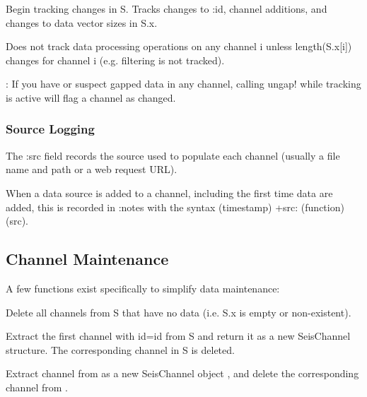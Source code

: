 \documentclass[letterpaper,11pt,english]{sphinxmanual}
\begin{document}
Begin tracking changes in S. Tracks changes to :id, channel additions, and
changes to data vector sizes in S.x.

Does not track data processing operations on any channel i unless
length(S.x{[}i{]}) changes for channel i (e.g. filtering is not tracked).

: If you have or suspect gapped data in any channel, calling
ungap! while tracking is active will flag a channel as changed.


\subsubsection{Source Logging}
\label{\detokenize{src/working_with_data:source-logging}}
The :src field records the  source used to populate each channel (usually
a file name and path or a web request URL).

When a data source is added to a channel, including the first time data are
added, this is recorded in :notes with the syntax (timestamp) +src: (function) (src).


\subsection{Channel Maintenance}
\label{\detokenize{src/working_with_data:channel-maintenance}}
A few functions exist specifically to simplify data maintenance:


\begin{fulllineitems}
\end{fulllineitems}


Delete all channels from S that have no data (i.e. S.x is empty or non-existent).


\begin{fulllineitems}
\end{fulllineitems}


Extract the first channel with id=id from S and return it as a new SeisChannel
structure. The corresponding channel in S is deleted.


\begin{fulllineitems}
\end{fulllineitems}


Extract channel  from  as a new SeisChannel object , and delete
the corresponding channel from .
\end{document}
